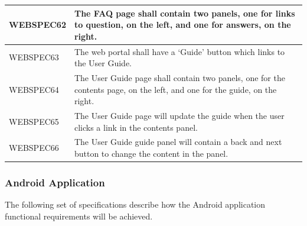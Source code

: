 \documentclass[11pt,a4paper]{article}
\begin{document}
\begin{longtable}{|p{2.5cm}p{13cm}|}
WEBSPEC62 & The FAQ page shall contain two panels, one for links to question, on the left, and one for answers, on the right. \\ \hline
WEBSPEC63 & The web portal shall have a `Guide' button which links to the User Guide. \\ \hline
WEBSPEC64 & The User Guide page shall contain two panels, one for the contents page, on the left, and one for the guide, on the right. \\ \hline
WEBSPEC65 & The User Guide page will update the guide when the user clicks a link in the contents panel.  \\ \hline
WEBSPEC66 & The User Guide guide panel will contain a back and next button to change the content in the panel. \\ \hline
\end{longtable}

\subsubsection{Android Application}

The following set of specifications describe how the Android application functional requirements will be achieved.
\end{document}
